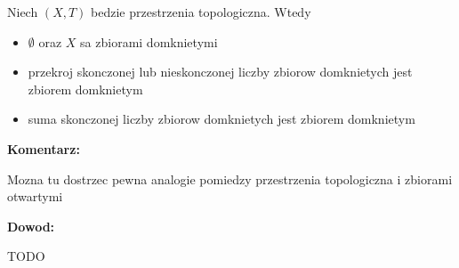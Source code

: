 \documentclass{article}
\begin{document}
\begin{tcolorbox}[colback=white!90!green,colframe=black!35!green,title=1.2.5 Lemat: Przestrzen topologiczna i zbiory domkniete]

    Niech $(X,T)$ bedzie przestrzenia topologiczna. Wtedy

    \begin{itemize}%
        \item $\emptyset$ oraz $X$ sa zbiorami domknietymi
        \item przekroj skonczonej lub nieskonczonej liczby zbiorow domknietych jest zbiorem domknietym
        \item suma skonczonej liczby zbiorow domknietych jest zbiorem domknietym

    \end{itemize}%
\end{tcolorbox}
\textbf{Komentarz:}

Mozna tu dostrzec pewna analogie pomiedzy przestrzenia topologiczna i zbiorami otwartymi

\textbf{Dowod:}

TODO

\hrulefill
\end{document}
